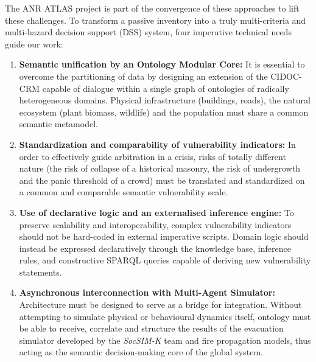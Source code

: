 \documentclass{article}
\begin{document}
The ANR ATLAS project is part of the convergence of these approaches to lift these challenges. To transform a passive inventory into a truly multi-criteria and multi-hazard decision support (DSS) system, four imperative technical needs guide our work:

\begin{enumerate}
\item \textbf {Semantic unification by an Ontology Modular Core:} It is essential to overcome the partitioning of data by designing an extension of the CIDOC-CRM capable of dialogue within a single graph of ontologies of radically heterogeneous domains. Physical infrastructure (buildings, roads), the natural ecosystem (plant biomass, wildlife) and the population must share a common semantic metamodel.
\item \textbf {Standardization and comparability of vulnerability indicators:} In order to effectively guide arbitration in a crisis, risks of totally different nature (the risk of collapse of a historical masonry, the risk of undergrowth and the panic threshold of a crowd) must be translated and standardized on a common and comparable semantic vulnerability scale.
\item \textbf{Use of declarative logic and an externalised inference engine:} To preserve scalability and interoperability, complex vulnerability indicators should not be hard-coded in external imperative scripts. Domain logic should instead be expressed declaratively through the knowledge base, inference rules, and constructive SPARQL queries capable of deriving new vulnerability statements.
\item \textbf {Asynchronous interconnection with Multi-Agent Simulator:} Architecture must be designed to serve as a bridge for integration. Without attempting to simulate physical or behavioural dynamics itself, ontology must be able to receive, correlate and structure the results of the evacuation simulator developed by the \textit{SocSIM-K} team and fire propagation models, thus acting as the semantic decision-making core of the global system.
\end{enumerate}
\end{document}

